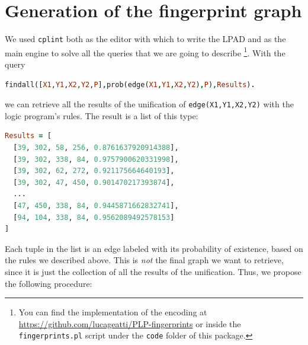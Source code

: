 \documentclass[8pt]{article}
\begin{document}
\section{Generation of the fingerprint graph}
\label{sec:graphgen}
We used \texttt{cplint} \cite{alberti2017cplint} both as the editor with which
to write the LPAD and as the main engine to solve all the queries that we are
going to describe \footnote{You can find the implementation of the encoding at
\url{https://github.com/lucageatti/PLP-fingerprints} or inside the
\texttt{fingerprints.pl} script under the \texttt{code} folder of this
package.}.  With the query 
  \begin{center}
  \begin{lstlisting}[language=Prolog,frame = single,basicstyle=\footnotesize\ttfamily]
findall([X1,Y1,X2,Y2,P],prob(edge(X1,Y1,X2,Y2),P),Results).
  \end{lstlisting}
  \end{center}
we can retrieve all the results of the unification of \texttt{edge(X1,Y1,X2,Y2)}
with the logic program's rules. The result is a list of this type:
  \begin{center}
  \begin{lstlisting}[language=Prolog,frame = single,basicstyle=\footnotesize\ttfamily]
Results = [
  [39, 302, 58, 256, 0.8761637920914388],
  [39, 302, 338, 84, 0.9757900620331998],
  [39, 302, 62, 272, 0.921175664640193],
  [39, 302, 47, 450, 0.901470217393874],
  ...
  [47, 450, 338, 84, 0.9445871662832741],
  [94, 104, 338, 84, 0.9562089492578153]
]
  \end{lstlisting}
  \end{center}
Each tuple in the list is an edge labeled with its probability of existence,
based on the rules we described above. This is \emph{not} the final graph
we want to retrieve, since it is just the collection of all the results
of the unification. Thus, we propose the following procedure:
\end{document}
